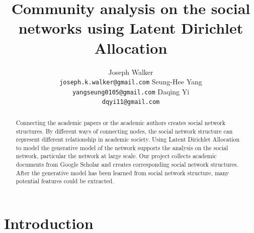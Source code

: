 \documentclass[letterpaper]{article}
\begin{document}
%
\title{Community analysis on the social networks using Latent Dirichlet Allocation}

\author{ 
	Joseph Walker 
	\\ \texttt{joseph.k.walker@gmail.com}
	\And Seung-Hee Yang 
	\\ \texttt{yangseung0105@gmail.com}
	\And Daqing Yi 
	\\ \texttt{dqyi11@gmail.com}
}
\maketitle

\begin{abstract}
Connecting the academic papers or the academic authors creates social network structures.
By different ways of connecting nodes, the social network structure can represent different relationship in academic society.
Using Latent Dirichlet Allocation to model the generative model of the network supports the analysis on the social network,
particular the network at large scale.
Our project collects academic documents from Google Scholar and creates corresponding social network structures.
After the generative model has been learned from social network structure,
many potential features could be extracted.

\end{abstract}

\section{Introduction}
\end{document}
